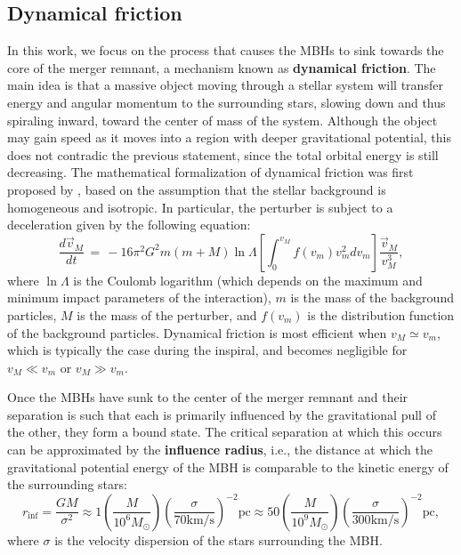 \documentclass[fleqn,usenatbib]{mnras}
\begin{document}
\subsection{Dynamical friction}\label{sec:introduction_dynamical_friction}
In this work, we focus on the process that causes the MBHs to sink towards the core of the merger remnant, a mechanism known as \textbf{dynamical friction}.
The main idea is that a massive object moving through a stellar system will transfer energy and angular momentum to the surrounding stars, slowing down and thus spiraling inward, toward the center of mass of the system. Although the object may gain speed as it moves into a region with deeper gravitational potential, this does not contradic the previous statement, since the total orbital energy is still decreasing.
The mathematical formalization of dynamical friction was first proposed by \cite{Chandrasekhar1943}, based on the assumption that the stellar background is homogeneous and isotropic.
In particular, the perturber is subject to a deceleration given by the following equation:
{\fontsize{8.5pt}{8.5pt}\begin{equation}
    \dfrac{d\vec{v}_M}{dt} \, = \, -16 \pi^2 G^2 m \left(m+M\right) \ln \Lambda \left[\int^{v_M}_0 f(v_m) v_m^2 dv_m\right] \dfrac{\vec{v}_M}{v_M^3},
    \label{eq:chandrasekhar}
\end{equation}}
where $\ln \Lambda$ is the Coulomb logarithm (which depends on the maximum and minimum impact parameters of the interaction), $m$ is the mass of the background particles, $M$ is the mass of the perturber, and $f(v_m)$ is the distribution function of the background particles.
Dynamical friction is most efficient when $v_M \simeq v_m$, which is typically the case during the inspiral, and becomes negligible for $v_M \ll v_m$ or $v_M \gg v_m$.

Once the MBHs have sunk to the center of the merger remnant and their separation is such that each is primarily influenced by the gravitational pull of the other, they form a bound state.
The critical separation at which this occurs can be approximated by the \textbf{influence radius}, i.e., the distance at which the gravitational potential energy of the MBH is comparable to the kinetic energy of the surrounding stars:
{\fontsize{7.4pt}{7.4pt}\begin{equation}
    r_\text{inf} = \dfrac{GM}{\sigma^2} 
    \approx 1 \left(\dfrac{M}{10^6 M_\odot}\right) \left(\dfrac{\sigma}{70 \text{km/s}}\right)^{-2} \text{pc} 
    \approx 50 \left(\dfrac{M}{10^9 M_\odot}\right) \left(\dfrac{\sigma}{300 \text{km/s}}\right)^{-2} \text{pc} ,
    \label{eq:influence_radius}
\end{equation}}
where $\sigma$ is the velocity dispersion of the stars surrounding the MBH.
\end{document}

